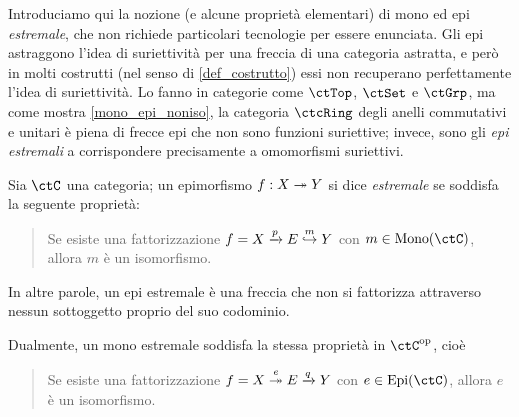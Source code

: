 Introduciamo qui la nozione (e alcune proprietà elementari) di mono ed epi \emph{estremale}, che non richiede particolari tecnologie per essere enunciata. Gli epi astraggono l'idea di suriettività per una freccia di una categoria astratta, e però in molti costrutti (nel senso di \ref{def_costrutto}) essi non recuperano perfettamente l'idea di suriettività. Lo fanno in categorie come \(\ctTop\), \(\ctSet\) e \(\ctGrp\), ma come mostra \ref{mono_epi_noniso}, la categoria \(\ctcRing\) degli anelli commutativi e unitari è piena di frecce epi che non sono funzioni suriettive; invece, sono gli \emph{epi estremali} a corrispondere precisamente a omomorfismi suriettivi.%
\begin{definition}\label{def_monoepi_estrem}
	Sia \(\ctC\) una categoria; un epimorfismo \(f : X \twoheadrightarrow Y\) si dice \emph{estremale} se soddisfa la seguente proprietà:
	\begin{quote}
		Se esiste una fattorizzazione \(f = X \xrightarrow{p} E \overset m{\hookrightarrow} Y\) con \(m \in\Mono[\ctC]\), allora \(m\) è un isomorfismo.
	\end{quote}
	In altre parole, un epi estremale è una freccia che non si fattorizza attraverso nessun sottoggetto proprio del suo codominio.

	Dualmente, un mono estremale soddisfa la stessa proprietà in \(\ctC^\op\), cioè
	\begin{quote}
		Se esiste una fattorizzazione \(f = X \overset e{\twoheadrightarrow} E \xrightarrow{q} Y\) con \(e \in\Epi[\ctC]\), allora \(e\) è un isomorfismo.
	\end{quote}
\end{definition}
